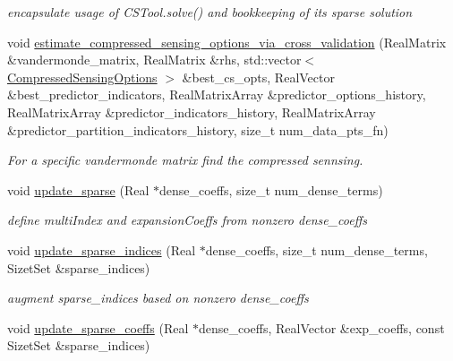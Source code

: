 \begin{DoxyCompactItemize}
\begin{DoxyCompactList}\small\item\em encapsulate usage of C\+S\+Tool.\+solve() and bookkeeping of its sparse solution \end{DoxyCompactList}\item 
void \hyperlink{classPecos_1_1RegressOrthogPolyApproximation_ab9b4257400d6a5dc9ede939b798ba7ff}{estimate\+\_\+compressed\+\_\+sensing\+\_\+options\+\_\+via\+\_\+cross\+\_\+validation} (Real\+Matrix \&vandermonde\+\_\+matrix, Real\+Matrix \&rhs, std\+::vector$<$ \hyperlink{classPecos_1_1CompressedSensingOptions}{Compressed\+Sensing\+Options} $>$ \&best\+\_\+cs\+\_\+opts, Real\+Vector \&best\+\_\+predictor\+\_\+indicators, Real\+Matrix\+Array \&predictor\+\_\+options\+\_\+history, Real\+Matrix\+Array \&predictor\+\_\+indicators\+\_\+history, Real\+Matrix\+Array \&predictor\+\_\+partition\+\_\+indicators\+\_\+history, size\+\_\+t num\+\_\+data\+\_\+pts\+\_\+fn)\label{classPecos_1_1RegressOrthogPolyApproximation_ab9b4257400d6a5dc9ede939b798ba7ff}

\begin{DoxyCompactList}\small\item\em For a specific vandermonde matrix find the compressed sennsing. \end{DoxyCompactList}\item 
void \hyperlink{classPecos_1_1RegressOrthogPolyApproximation_ae24741be7aa96a157561ff4f29884bdf}{update\+\_\+sparse} (Real $\ast$dense\+\_\+coeffs, size\+\_\+t num\+\_\+dense\+\_\+terms)\label{classPecos_1_1RegressOrthogPolyApproximation_ae24741be7aa96a157561ff4f29884bdf}

\begin{DoxyCompactList}\small\item\em define multi\+Index and expansion\+Coeffs from nonzero dense\+\_\+coeffs \end{DoxyCompactList}\item 
void \hyperlink{classPecos_1_1RegressOrthogPolyApproximation_a710dea77684cad24de3ce1bdc9557608}{update\+\_\+sparse\+\_\+indices} (Real $\ast$dense\+\_\+coeffs, size\+\_\+t num\+\_\+dense\+\_\+terms, Sizet\+Set \&sparse\+\_\+indices)\label{classPecos_1_1RegressOrthogPolyApproximation_a710dea77684cad24de3ce1bdc9557608}

\begin{DoxyCompactList}\small\item\em augment sparse\+\_\+indices based on nonzero dense\+\_\+coeffs \end{DoxyCompactList}\item 
void \hyperlink{classPecos_1_1RegressOrthogPolyApproximation_a4d9aca3b0892e8d46e8c417ca1845ecb}{update\+\_\+sparse\+\_\+coeffs} (Real $\ast$dense\+\_\+coeffs, Real\+Vector \&exp\+\_\+coeffs, const Sizet\+Set \&sparse\+\_\+indices)\label{classPecos_1_1RegressOrthogPolyApproximation_a4d9aca3b0892e8d46e8c417ca1845ecb}


\end{DoxyCompactItemize}
